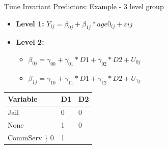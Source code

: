 \documentclass[ignorenonframetext,]{beamer}
\begin{document}
\begin{frame}{Time Invariant Predictors: Example - 3 level group}

\begin{itemize}
  \item \textbf{Level 1:} $Y_{ij} = \beta_{0j} + \beta_{1j}*age0_{ij} + \varepsilon{ij}$
  \item \textbf{Level 2:} 
    \begin{itemize} 
      \item $\beta_{0j} = \gamma_{00} + \gamma_{01}*D1 + \gamma_{02}*D2 + U_{0j}$
      \item $\beta_{1j} = \gamma_{10} + \gamma_{11}*D1 + \gamma_{12}*D2 + U_{1j}$
    \end{itemize}
\end{itemize}

\begin{longtable}[]{@{}lll@{}}
\toprule
Variable & D1 & D2\tabularnewline
\midrule
\endhead
Jail & 0 & 0\tabularnewline
None & 1 & 0\tabularnewline
CommServ \} 0 & 1\tabularnewline
\bottomrule
\end{longtable}

\end{frame}
\end{document}
